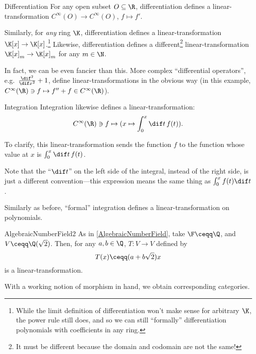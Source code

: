 \begin{exm}{Differentiation}{}
	For any open subset $O\subseteq \R$, differentiation defines a linear-transformation $C^{\infty}(O)\rightarrow C^{\infty}(O)$, $f\mapsto f'$.
	
	Similarly, for \emph{any} ring $\K$, differentiation defines a linear-transformation $\K [x]\rightarrow \K [x]$.\footnote{While the limit definition of differentiation won't make sense for arbitrary $\K$, the power rule still does, and so we can still ``formally'' differentiation polynomials with coefficients in any ring.}  Likewise, differentiation defines a different\footnote{It must be different because the domain and codomain are not the same!} linear-transformation $\K [x]_m\rightarrow \K [x]_m$ for any $m\in \N$.
	
	In fact, we can be even fancier than this.  More complex ``differential operators'', e.g.~$\frac{\dif ^2}{\dif x^2}+1$, define linear-transformations in the obvious way (in this example, $C^{\infty}(\R )\ni f\mapsto f''+f\in C^{\infty}(\R )$).
\end{exm}
\begin{exm}{Integration}{}
	Integration likewise defines a linear-transformation:
	\begin{equation}
		C^{\infty}(\R )\ni f\mapsto (x\mapsto \int _0^x\dif t\, f(t)).
	\end{equation}
	\begin{rmk}
		To clarify, this linear-transformation sends the function $f$ to the function whose value at $x$ is $\int _0^x\dif t\, f(t)$.
	\end{rmk}
	\begin{rmk}
		Note that the ``$\dif t$'' on the left side of the integral, instead of the right side, is just a different convention---this expression means the same thing as $\int _0^xf(t)\dif t$.
	\end{rmk}

	Similarly as before, ``formal'' integration defines a linear-transformation on polynomials.
\end{exm}
\begin{exm}{}{AlgebraicNumberField2}
	As in \cref{AlgebraicNumberField}, take $\F \ceqq \Q$, and $V\ceqq \Q (\sqrt{2})$.  Then, for any $a,b\in \Q$, $T\colon V\rightarrow V$ defined by
	\begin{equation}
		T(x)\ceqq (a+b\sqrt{2})x
	\end{equation}
	is a linear-transformation.
\end{exm}
With a working notion of morphism in hand, we obtain corresponding categories.
